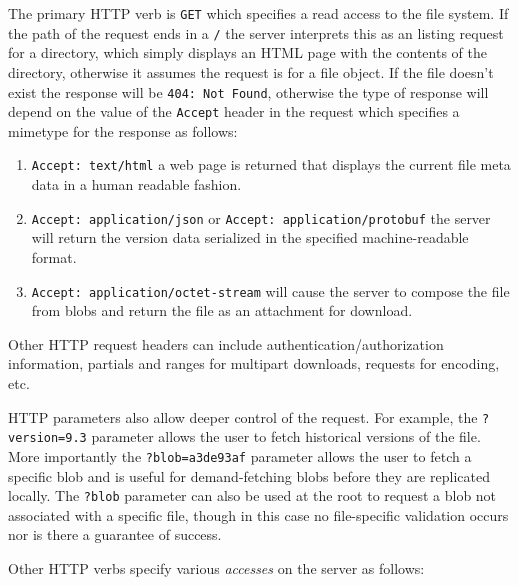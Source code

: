 \documentclass[letterpaper,twocolumn,10pt]{article}
\begin{document}
The primary HTTP verb is \texttt{GET} which specifies a read access to the
file system.
If the path of the request ends in a \texttt{/} the server interprets this as
an listing request for a directory, which simply displays an HTML page with
the contents of the directory, otherwise it assumes the request is for a file
object.
If the file doesn't exist the response will be \texttt{404: Not Found},
otherwise the type of response will depend on the value of the \texttt{Accept}
header in the request which specifies a mimetype for the response as follows:

\begin{enumerate}
    \item \texttt{Accept: text/html} a web page is returned that
    displays the current file meta data in a human readable fashion.
    \item \texttt{Accept: application/json} or \texttt{Accept:
    application/protobuf} the server will return the version data serialized
    in the specified machine-readable format.
    \item \texttt{Accept: application/octet-stream} will cause the server to
    compose the file from blobs and return the file as an attachment for
    download.
\end{enumerate}

Other HTTP request headers can include authentication/authorization
information, partials and ranges for multipart downloads, requests for
encoding, etc.

HTTP parameters also allow deeper control of the request.
For example, the \texttt{?version=9.3} parameter allows the user to fetch
historical versions of the file.
More importantly the \texttt{?blob=a3de93af} parameter allows the user to
fetch a specific blob and is useful for demand-fetching blobs before they
are replicated locally.
The \texttt{?blob} parameter can also be used at the root to request a blob
not associated with a specific file, though in this case no file-specific
validation occurs nor is there a guarantee of success.

Other HTTP verbs specify various \textit{accesses} on the server as follows:
\end{document}

